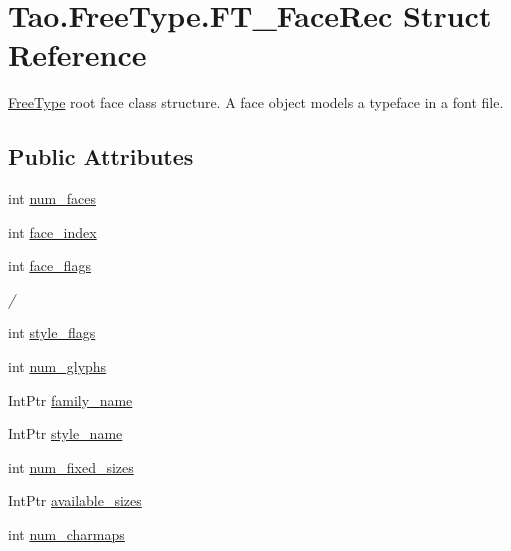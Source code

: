 \hypertarget{struct_tao_1_1_free_type_1_1_f_t___face_rec}{
\section{Tao.FreeType.FT\_\-FaceRec Struct Reference}
\label{struct_tao_1_1_free_type_1_1_f_t___face_rec}
}


\hyperlink{namespace_tao_1_1_free_type}{FreeType} root face class structure. A face object models a typeface in a font file.  


\subsection*{Public Attributes}
\begin{DoxyCompactItemize}
\item 
int \hyperlink{struct_tao_1_1_free_type_1_1_f_t___face_rec_a916ae3a62c555fdc08948d6128d2b2dc}{num\_\-faces}
\item 
int \hyperlink{struct_tao_1_1_free_type_1_1_f_t___face_rec_a94fe78339b81c2ac94325bb9b2d18e57}{face\_\-index}
\item 
int \hyperlink{struct_tao_1_1_free_type_1_1_f_t___face_rec_a9956ab2f629ef33288242d14a3b050e8}{face\_\-flags}
\begin{DoxyCompactList}\small\item\em / \item\end{DoxyCompactList}\item 
int \hyperlink{struct_tao_1_1_free_type_1_1_f_t___face_rec_a30b2b85c4ec62c15b550266d83a7d8f2}{style\_\-flags}
\item 
int \hyperlink{struct_tao_1_1_free_type_1_1_f_t___face_rec_a9f7991aebde1e2fe17c0231f86f31943}{num\_\-glyphs}
\item 
IntPtr \hyperlink{struct_tao_1_1_free_type_1_1_f_t___face_rec_a2ef75b40558cbdd3f9db7e46a9279706}{family\_\-name}
\item 
IntPtr \hyperlink{struct_tao_1_1_free_type_1_1_f_t___face_rec_a3e4be8a59c23dc1a99748626e1ce827a}{style\_\-name}
\item 
int \hyperlink{struct_tao_1_1_free_type_1_1_f_t___face_rec_a57abc2c7f993b1b9b9d230fdb877f7fc}{num\_\-fixed\_\-sizes}
\item 
IntPtr \hyperlink{struct_tao_1_1_free_type_1_1_f_t___face_rec_a53b91399ce836fc6a42b69cb94dbc9bd}{available\_\-sizes}
\item 
int \hyperlink{struct_tao_1_1_free_type_1_1_f_t___face_rec_aa08e803cd2fc2f8f48d7f2f4fb0bcc55}{num\_\-charmaps}

\end{DoxyCompactItemize}
